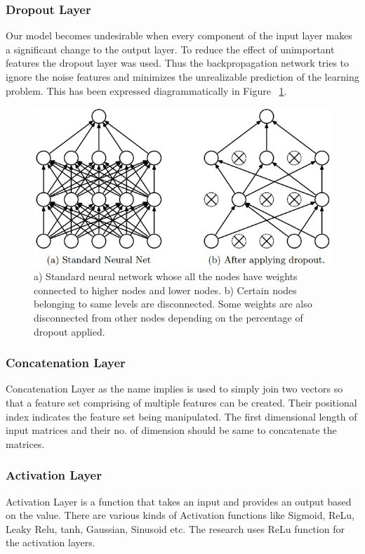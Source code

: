   \subsubsection{Dropout Layer}
  Our model becomes undesirable when every component of the input layer makes a significant change to the output layer. To reduce the effect of unimportant features the dropout layer was used. Thus the backpropagation network tries to ignore the noise features and minimizes the unrealizable prediction of the learning problem. This has been expressed diagrammatically in Figure ~\ref{fig:dropout}.
  \begin{figure}[tbh] \centering
    \captionsetup{justification=justified}
    \includegraphics[width=.5\linewidth]{mainmatter/3-Methodology/images/dropout.jpeg}
    \caption[Dropout Layer]{a) Standard neural network whose all the nodes have weights connected to higher nodes and lower nodes. 
    b) Certain nodes belonging to same levels are disconnected. Some weights are also disconnected from other nodes depending on the percentage of dropout applied.}
    \label{fig:dropout}
  
  \end{figure}
  
  
  
  \subsubsection{Concatenation Layer}
  Concatenation Layer as the name implies is used to simply join two vectors so that a feature set comprising of multiple features can be created. Their positional index indicates the feature set being manipulated. The first dimensional length of input matrices and their no. of dimension should be same to concatenate the matrices.

  \subsubsection{Activation Layer}
  
  Activation Layer is a function that takes an input and provides an output based on the value. There are various kinds of Activation functions like Sigmoid, ReLu, Leaky Relu, tanh, Gaussian, Sinusoid etc. The research uses ReLu function for the activation layers.
  
